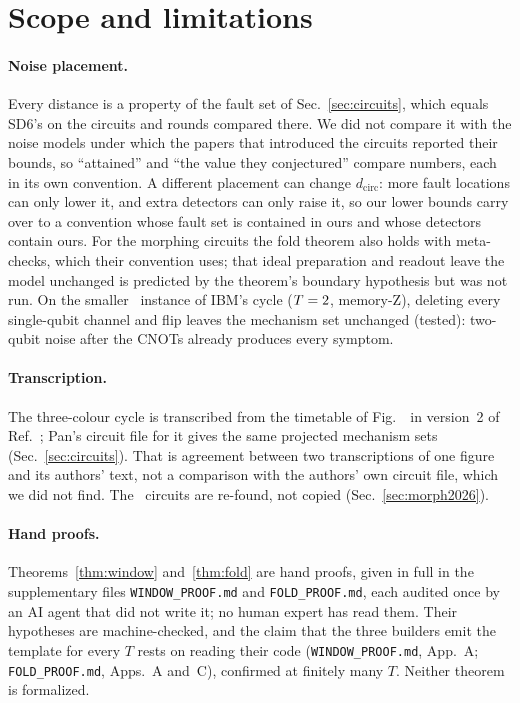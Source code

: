 \documentclass[aps,pra,twocolumn,superscriptaddress,nofootinbib,longbibliography,floatfix]{revtex4-2}
\newcommand{\dc}{d_{\mathrm{circ}}}
\begin{document}
\section{Scope and limitations}
\label{sec:scope}

\paragraph*{Noise placement.} Every distance is a property of the fault set of Sec.~\ref{sec:circuits}, which equals SD6's on the circuits and rounds compared there. We did not compare it with the noise models under which the papers that introduced the circuits reported their bounds, so ``attained'' and ``the value they conjectured'' compare numbers, each in its own convention. A different placement can change $\dc$: more fault locations can only lower it, and extra detectors can only raise it, so our lower bounds carry over to a convention whose fault set is contained in ours and whose detectors contain ours. For the morphing circuits the fold theorem also holds with meta-checks, which their convention uses; that ideal preparation and readout leave the model unchanged is predicted by the theorem's boundary hypothesis but was not run. On the smaller \SmallCode\ instance of IBM's cycle ($T=2$, memory-Z), deleting every single-qubit channel and flip leaves the mechanism set unchanged (tested): two-qubit noise after the CNOTs already produces every symptom.

\paragraph*{Transcription.} The three-colour cycle is transcribed from the timetable of Fig.~\SBBFigCycle\ in version~2 of Ref.~\cite{strikis2026high}; Pan's circuit file for it gives the same projected mechanism sets (Sec.~\ref{sec:circuits}). That is agreement between two transcriptions of one figure and its authors' text, not a comparison with the authors' own circuit file, which we did not find. The \STbYear\ circuits are re-found, not copied (Sec.~\ref{sec:morph2026}).

\paragraph*{Hand proofs.} Theorems~\ref{thm:window} and~\ref{thm:fold} are hand proofs, given in full in the supplementary files \texttt{WINDOW\_PROOF.md} and \texttt{FOLD\_PROOF.md}, each audited once by an AI agent that did not write it; no human expert has read them. Their hypotheses are machine-checked, and the claim that the three builders emit the template for every $T$ rests on reading their code (\texttt{WINDOW\_PROOF.md}, App.~A; \texttt{FOLD\_PROOF.md}, Apps.~A and~C), confirmed at finitely many $T$. Neither theorem is formalized.
\end{document}
